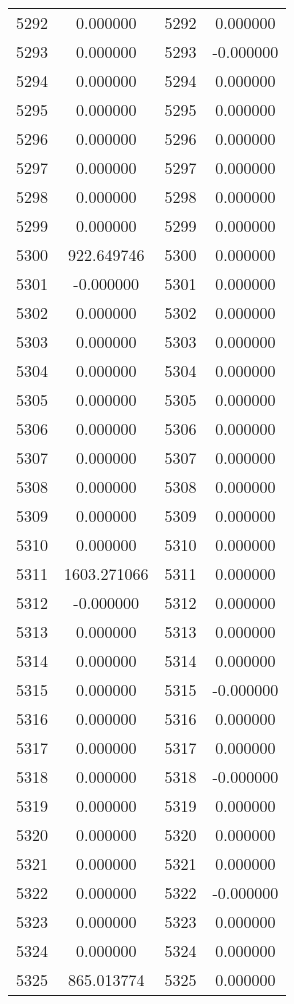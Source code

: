 \documentclass[12pt]{article}
\begin{document}
\begin{longtable}{@{}cccc@{}}
5292 & 0.000000 & 5292 & 0.000000 \\
5293 & 0.000000 & 5293 & -0.000000 \\
5294 & 0.000000 & 5294 & 0.000000 \\
5295 & 0.000000 & 5295 & 0.000000 \\
5296 & 0.000000 & 5296 & 0.000000 \\
5297 & 0.000000 & 5297 & 0.000000 \\
5298 & 0.000000 & 5298 & 0.000000 \\
5299 & 0.000000 & 5299 & 0.000000 \\
5300 & 922.649746 & 5300 & 0.000000 \\
5301 & -0.000000 & 5301 & 0.000000 \\
5302 & 0.000000 & 5302 & 0.000000 \\
5303 & 0.000000 & 5303 & 0.000000 \\
5304 & 0.000000 & 5304 & 0.000000 \\
5305 & 0.000000 & 5305 & 0.000000 \\
5306 & 0.000000 & 5306 & 0.000000 \\
5307 & 0.000000 & 5307 & 0.000000 \\
5308 & 0.000000 & 5308 & 0.000000 \\
5309 & 0.000000 & 5309 & 0.000000 \\
5310 & 0.000000 & 5310 & 0.000000 \\
5311 & 1603.271066 & 5311 & 0.000000 \\
5312 & -0.000000 & 5312 & 0.000000 \\
5313 & 0.000000 & 5313 & 0.000000 \\
5314 & 0.000000 & 5314 & 0.000000 \\
5315 & 0.000000 & 5315 & -0.000000 \\
5316 & 0.000000 & 5316 & 0.000000 \\
5317 & 0.000000 & 5317 & 0.000000 \\
5318 & 0.000000 & 5318 & -0.000000 \\
5319 & 0.000000 & 5319 & 0.000000 \\
5320 & 0.000000 & 5320 & 0.000000 \\
5321 & 0.000000 & 5321 & 0.000000 \\
5322 & 0.000000 & 5322 & -0.000000 \\
5323 & 0.000000 & 5323 & 0.000000 \\
5324 & 0.000000 & 5324 & 0.000000 \\
5325 & 865.013774 & 5325 & 0.000000 \\

\end{longtable}
\end{document}
